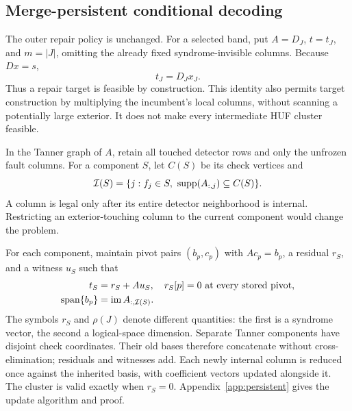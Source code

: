 \subsection{Merge-persistent conditional decoding}\label{sec:meld}
The outer repair policy is unchanged. For a selected band, put $A=D_J$, $t=t_J$, and $m=|J|$, omitting the already fixed syndrome-invisible columns. Because $Dx=s$,
\begin{equation}t_J=D_Jx_J.\label{eq:incumbenttarget}\end{equation}
Thus a repair target is feasible by construction. This identity also permits target construction by multiplying the incumbent's local columns, without scanning a potentially large exterior. It does not make every intermediate HUF cluster feasible.

In the Tanner graph of $A$, retain all touched detector rows and only the unfrozen fault columns. For a component $S$, let $C(S)$ be its check vertices and
\begin{equation}\mathcal I(S)=\{j:f_j\in S,\ \operatorname{supp}(A_{:,j})\subseteq C(S)\}.\label{eq:internal}\end{equation}
A column is legal only after its entire detector neighborhood is internal. Restricting an exterior-touching column to the current component would change the problem.

For each component, maintain pivot pairs $(b_p,c_p)$ with $Ac_p=b_p$, a residual $r_S$, and a witness $u_S$ such that
\begin{equation}
\begin{split}
t_S&=r_S+Au_S,\quad r_S[p]=0\ \text{at every stored pivot},\\
\operatorname{span}\{b_p\}&=\operatorname{im} A_{:,\mathcal I(S)}.
\end{split}\label{eq:invariant}
\end{equation}
The symbols $r_S$ and $\rho(J)$ denote different quantities: the first is a syndrome vector, the second a logical-space dimension. Separate Tanner components have disjoint check coordinates. Their old bases therefore concatenate without cross-elimination; residuals and witnesses add. Each newly internal column is reduced once against the inherited basis, with coefficient vectors updated alongside it. The cluster is valid exactly when $r_S=0$. Appendix~\ref{app:persistent} gives the update algorithm and proof.

